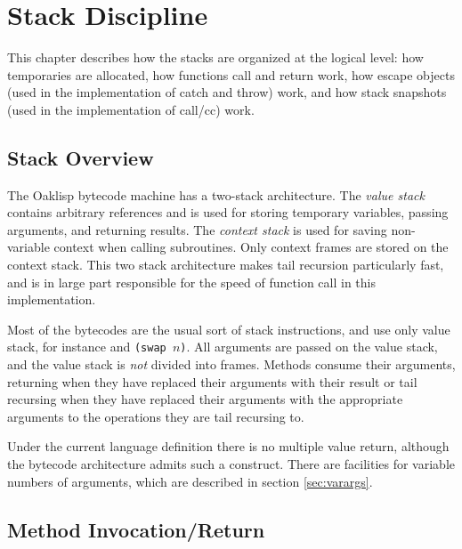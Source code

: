 \chapter{Stack Discipline}

This chapter describes how the stacks are organized at the logical
level: how temporaries are allocated, how functions call and return
work, how escape objects (used in the implementation of catch and
throw) work, and how stack snapshots (used in the implementation of
call/cc) work.

\section{Stack Overview}

The Oaklisp bytecode machine has a two-stack architecture.  The {\em
value stack} contains arbitrary references and is used for storing
temporary variables, passing arguments, and returning results.  The
{\em context stack} is used for saving non-variable context when
calling subroutines.  Only context frames are stored on the context
stack.  This two stack architecture makes tail recursion particularly
fast, and is in large part responsible for the speed of function call
in this implementation.

Most of the bytecodes are the usual sort of stack instructions, and
use only value stack, for instance  and {\tt (swap
$n$)}.  All arguments are passed on the value stack,
and the value stack is {\em not} divided into frames.  Methods consume
their arguments, returning when they have replaced their arguments
with their result or tail recursing when they have replaced their
arguments with the appropriate arguments to the operations they are
tail recursing to.

Under the current language definition there is no multiple value
return, although the bytecode architecture admits such a construct.
There are facilities for variable numbers of arguments, which are
described in section \ref{sec:varargs}.


\newenvironment{stackphoto}{\begin{center}\begin{tabular}{|c|}
$\vdots$\\\hline}{\end{tabular}\end{center}}

\section{Method Invocation/Return}

